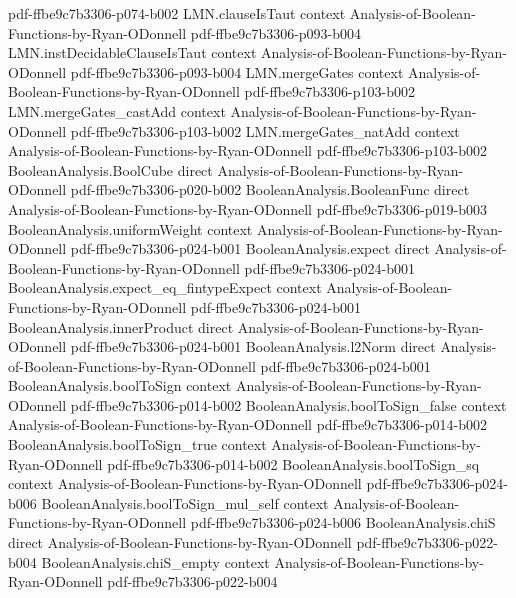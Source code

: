\begin{lemma}
  {pdf-ffbe9c7b3306-p074-b002}
\proofstep
  {LMN.clauseIsTaut}
  {context}
  {Analysis-of-Boolean-Functions-by-Ryan-ODonnell}
  {pdf-ffbe9c7b3306-p093-b004}
\proofstep
  {LMN.instDecidableClauseIsTaut}
  {context}
  {Analysis-of-Boolean-Functions-by-Ryan-ODonnell}
  {pdf-ffbe9c7b3306-p093-b004}
\proofstep
  {LMN.mergeGates}
  {context}
  {Analysis-of-Boolean-Functions-by-Ryan-ODonnell}
  {pdf-ffbe9c7b3306-p103-b002}
\proofstep
  {LMN.mergeGates_castAdd}
  {context}
  {Analysis-of-Boolean-Functions-by-Ryan-ODonnell}
  {pdf-ffbe9c7b3306-p103-b002}
\proofstep
  {LMN.mergeGates_natAdd}
  {context}
  {Analysis-of-Boolean-Functions-by-Ryan-ODonnell}
  {pdf-ffbe9c7b3306-p103-b002}
\proofstep
  {BooleanAnalysis.BoolCube}
  {direct}
  {Analysis-of-Boolean-Functions-by-Ryan-ODonnell}
  {pdf-ffbe9c7b3306-p020-b002}
\proofstep
  {BooleanAnalysis.BooleanFunc}
  {direct}
  {Analysis-of-Boolean-Functions-by-Ryan-ODonnell}
  {pdf-ffbe9c7b3306-p019-b003}
\proofstep
  {BooleanAnalysis.uniformWeight}
  {context}
  {Analysis-of-Boolean-Functions-by-Ryan-ODonnell}
  {pdf-ffbe9c7b3306-p024-b001}
\proofstep
  {BooleanAnalysis.expect}
  {direct}
  {Analysis-of-Boolean-Functions-by-Ryan-ODonnell}
  {pdf-ffbe9c7b3306-p024-b001}
\proofstep
  {BooleanAnalysis.expect_eq_fintypeExpect}
  {context}
  {Analysis-of-Boolean-Functions-by-Ryan-ODonnell}
  {pdf-ffbe9c7b3306-p024-b001}
\proofstep
  {BooleanAnalysis.innerProduct}
  {direct}
  {Analysis-of-Boolean-Functions-by-Ryan-ODonnell}
  {pdf-ffbe9c7b3306-p024-b001}
\proofstep
  {BooleanAnalysis.l2Norm}
  {direct}
  {Analysis-of-Boolean-Functions-by-Ryan-ODonnell}
  {pdf-ffbe9c7b3306-p024-b001}
\proofstep
  {BooleanAnalysis.boolToSign}
  {context}
  {Analysis-of-Boolean-Functions-by-Ryan-ODonnell}
  {pdf-ffbe9c7b3306-p014-b002}
\proofstep
  {BooleanAnalysis.boolToSign_false}
  {context}
  {Analysis-of-Boolean-Functions-by-Ryan-ODonnell}
  {pdf-ffbe9c7b3306-p014-b002}
\proofstep
  {BooleanAnalysis.boolToSign_true}
  {context}
  {Analysis-of-Boolean-Functions-by-Ryan-ODonnell}
  {pdf-ffbe9c7b3306-p014-b002}
\proofstep
  {BooleanAnalysis.boolToSign_sq}
  {context}
  {Analysis-of-Boolean-Functions-by-Ryan-ODonnell}
  {pdf-ffbe9c7b3306-p024-b006}
\proofstep
  {BooleanAnalysis.boolToSign_mul_self}
  {context}
  {Analysis-of-Boolean-Functions-by-Ryan-ODonnell}
  {pdf-ffbe9c7b3306-p024-b006}
\proofstep
  {BooleanAnalysis.chiS}
  {direct}
  {Analysis-of-Boolean-Functions-by-Ryan-ODonnell}
  {pdf-ffbe9c7b3306-p022-b004}
\proofstep
  {BooleanAnalysis.chiS_empty}
  {context}
  {Analysis-of-Boolean-Functions-by-Ryan-ODonnell}
  {pdf-ffbe9c7b3306-p022-b004}

\end{lemma}
